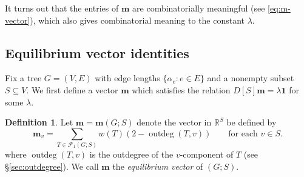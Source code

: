 \documentclass[12pt]{amsart}
\theoremstyle{definition}
\newtheorem{dfn}[thm]{Definition}
\newcommand{\RR}{\mathbb{R}}
\newcommand{\bone}{\mathbf{1}}
\newcommand{\boldm}{\mathbf{m}}
\newcommand{\tr}{\intercal}
\DeclareMathOperator{\cof}{cof}
\newcommand{\trees}{\mathcal{F}_1}
\DeclareMathOperator{\outdeg}{outdeg}
\begin{document}
	




It turns out that the entries of $\boldm$ are combinatorially meaningful (see \eqref{eq:m-vector}),
which also gives combinatorial meaning to
the constant $\lambda$.

\subsection{Equilibrium vector identities}

Fix a tree $G = (V,E)$ with edge lengths $\{\alpha_e \colon e \in E\}$ and a nonempty subset $S \subseteq V$.
We first define a vector $\boldm$ which satisfies the relation $D[S] \boldm = \lambda \bone$ for some $\lambda$.

\begin{dfn}
\label{dfn:m-vector}
Let $\boldm = \boldm(G;S)$ denote the vector in $\RR^S$ be defined by
\begin{equation}
\label{eq:m-vector}
\boldm_v =  \sum_{T \in \trees(G;S)} w({T}) (2 - \outdeg(T,v))
\qquad\text{for each }v \in S.
\end{equation}
where $\outdeg(T,v)$ is the outdegree of the $v$-component of $T$ (see \S\ref{sec:outdegree}).
We call $\boldm$ the {\em equilibrium vector} of $(G; S)$.
\end{dfn}
\end{document}
